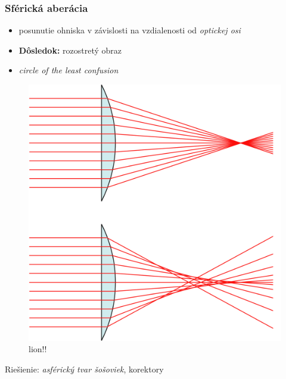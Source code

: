 \documentclass[10pt,xcolor=pdflatex]{beamer}
\begin{document}
\begin{frame}\frametitle{Sférická aberácia}
    \begin{itemize}
        \item posunutie ohniska v závislosti na vzdialenosti od \textit{optickej osi}
        \item \textbf{Dôsledok:} rozostretý obraz 
        \item \textit{circle of the least confusion}
    \end{itemize}

    \begin{figure}
        \includegraphics[scale=0.1]{img/sphericalAberrationWikipedia.png}
        \caption{lion!!}
    \end{figure}
    Riešienie: \textit{asférický tvar šošoviek}, korektory
\end{frame}
\end{document}
